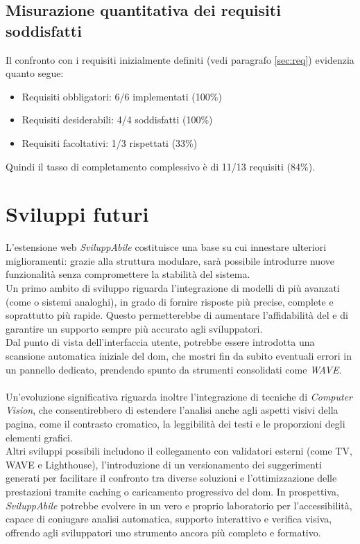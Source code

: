 \subsection{Misurazione quantitativa dei requisiti soddisfatti}
\noindent Il confronto con i requisiti inizialmente definiti (vedi paragrafo \ref{sec:req}) evidenzia quanto segue:
\begin{itemize}
    \item Requisiti obbligatori: 6/6 implementati (100\%)
    \item Requisiti desiderabili: 4/4 soddisfatti (100\%)
    \item Requisiti facoltativi: 1/3 rispettati (33\%)
\end{itemize}
Quindi il tasso di completamento complessivo è di 11/13 requisiti (84\%).

\section{Sviluppi futuri}
\noindent L’estensione web \textit{SviluppAbile} costituisce una base su cui innestare ulteriori miglioramenti: grazie alla struttura modulare, sarà possibile introdurre nuove funzionalità senza compromettere la stabilità del sistema.\\
Un primo ambito di sviluppo riguarda l’integrazione di modelli di  più avanzati (come  o sistemi analoghi), in grado di fornire risposte più precise, complete e soprattutto più rapide. Questo permetterebbe di aumentare l’affidabilità del  e di garantire un supporto sempre più accurato agli sviluppatori.\\
Dal punto di vista dell’interfaccia utente, potrebbe essere introdotta una scansione automatica iniziale del \acrshort{dom}, che mostri fin da subito eventuali errori in un pannello dedicato, prendendo spunto da strumenti consolidati come \textit{WAVE}.\\
\\
Un’evoluzione significativa riguarda inoltre l’integrazione di tecniche di \textit{Computer Vision}, che consentirebbero di estendere l’analisi anche agli aspetti visivi della pagina, come il contrasto cromatico, la leggibilità dei testi e le proporzioni degli elementi grafici.\\
Altri sviluppi possibili includono il collegamento con validatori esterni (come TV, WAVE e Lighthouse), l’introduzione di un versionamento dei suggerimenti generati per facilitare il confronto tra diverse soluzioni e l’ottimizzazione delle prestazioni tramite caching o caricamento progressivo del \acrshort{dom}.
In prospettiva, \textit{SviluppAbile} potrebbe evolvere in un vero e proprio laboratorio per l’accessibilità, capace di coniugare analisi automatica, supporto interattivo e verifica visiva, offrendo agli sviluppatori uno strumento ancora più completo e formativo.

